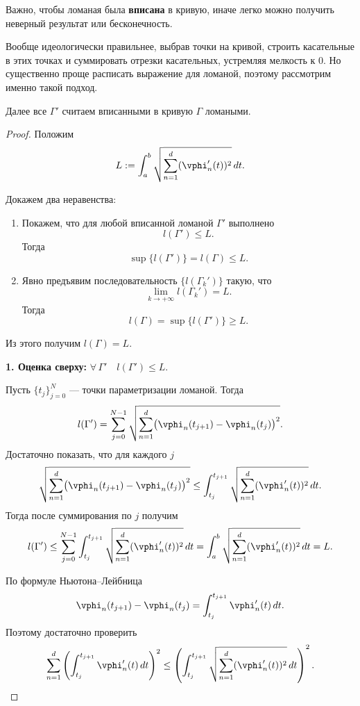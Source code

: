 \begin{remark}
	Важно, чтобы ломаная была \textbf{вписана} в кривую, иначе легко можно получить неверный результат или бесконечность.
	
	Вообще идеологически правильнее, выбрав точки на кривой, строить касательные в этих точках и суммировать отрезки касательных, устремляя мелкость к $0$. Но существенно проще расписать выражение для ломаной, поэтому рассмотрим именно такой подход.
\end{remark}

Далее все $\Gamma'$ считаем вписанными в кривую $\Gamma$ ломаными.

\begin{proof}
	Положим
	\[
	L:=\int_a^b \sqrt{\sum_{n=1}^d (\vphi_n'(t))^2}\,dt.
	\]
	
	Докажем два неравенства:
	\begin{enumerate}
		\item Покажем, что для любой вписанной ломаной $\Gamma'$ выполнено
		\[
		l(\Gamma')\le L.
		\]
		Тогда
		\[
		\sup\{l(\Gamma')\}=l(\Gamma)\le L.
		\]
		
		\item Явно предъявим последовательность $\{l(\Gamma_k')\}$ такую, что
		\[
		\lim_{k\to+\infty} l(\Gamma_k')=L.
		\]
		Тогда
		\[
		l(\Gamma)=\sup\{l(\Gamma')\}\ge L.
		\]
	\end{enumerate}
	Из этого получим $l(\Gamma)=L$.
	
	\vspace{2\baselineskip}
	
	\textbf{1. Оценка сверху:} $\forall\,\Gamma' \quad l(\Gamma')\le L$.
	
	Пусть $\{t_j\}_{j=0}^N$ --- точки параметризации ломаной. Тогда
	\[
	l(\Gamma')
	=
	\sum_{j=0}^{N-1}
	\sqrt{\sum_{n=1}^d \bigl(\vphi_n(t_{j+1})-\vphi_n(t_j)\bigr)^2}.
	\]
	Достаточно показать, что для каждого $j$
	\[
	\sqrt{\sum_{n=1}^d \bigl(\vphi_n(t_{j+1})-\vphi_n(t_j)\bigr)^2}
	\le
	\int_{t_j}^{t_{j+1}} \sqrt{\sum_{n=1}^d (\vphi_n'(t))^2}\,dt.
	\]
	Тогда после суммирования по $j$ получим
	\[
	l(\Gamma')
	\le
	\sum_{j=0}^{N-1}\int_{t_j}^{t_{j+1}} \sqrt{\sum_{n=1}^d (\vphi_n'(t))^2}\,dt
	=
	\int_a^b \sqrt{\sum_{n=1}^d (\vphi_n'(t))^2}\,dt
	=
	L.
	\]
	
	По формуле Ньютона--Лейбница
	\[
	\vphi_n(t_{j+1})-\vphi_n(t_j)=\int_{t_j}^{t_{j+1}} \vphi_n'(t)\,dt.
	\]
	Поэтому достаточно проверить
	\[
	\sum_{n=1}^d \left(\int_{t_j}^{t_{j+1}} \vphi_n'(t)\,dt\right)^2
	\le
	\left(\int_{t_j}^{t_{j+1}} \sqrt{\sum_{n=1}^d (\vphi_n'(t))^2}\,dt\right)^2.
	\]
	

\end{proof}
